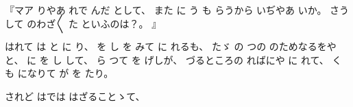 『マア
りやあ
れで
んだ
として、
%
また
に
う
も
らうから
いぢやあ
いか。
%
さうして
のわざ〳〵
た
といふのは？。
』

はれて
は
と
に
り、
%
を
し
を
みて
に
れるも、
%
たゞ
の
つの
のためなるをやと、
%
に
を
し
して、
%
ら
つて
を
げしが、
%
づるところの
ればにや
に
れて、
%
くも
になりて
が
を
たり。

されど
はでは
はざることゝて、

